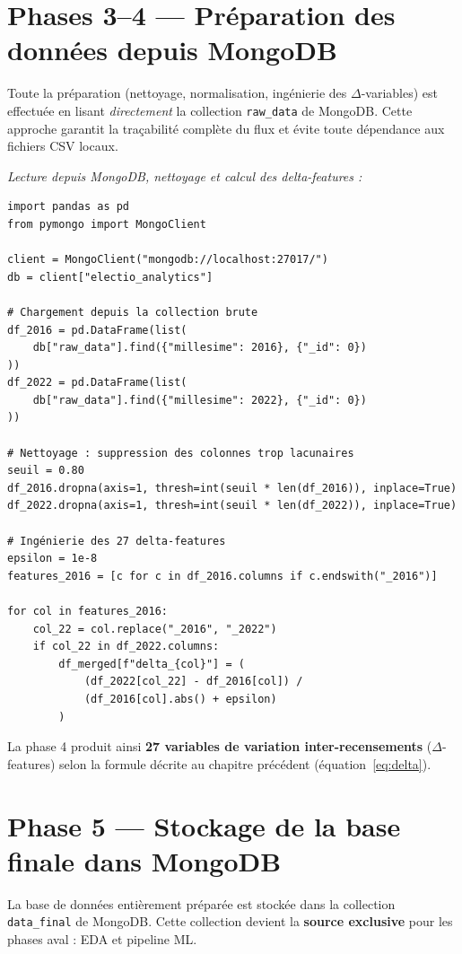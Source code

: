 \section{Phases 3--4 --- Préparation des données depuis MongoDB}

Toute la préparation (nettoyage, normalisation, ingénierie des
\texorpdfstring{$\Delta$}{delta}-variables) est effectuée en lisant
\emph{directement} la collection \texttt{raw\_data} de MongoDB.
Cette approche garantit la traçabilité complète du flux et évite toute
dépendance aux fichiers CSV locaux.

\medskip\noindent\textit{Lecture depuis MongoDB, nettoyage et calcul des delta-features :}
\begin{verbatim}
import pandas as pd
from pymongo import MongoClient

client = MongoClient("mongodb://localhost:27017/")
db = client["electio_analytics"]

# Chargement depuis la collection brute
df_2016 = pd.DataFrame(list(
    db["raw_data"].find({"millesime": 2016}, {"_id": 0})
))
df_2022 = pd.DataFrame(list(
    db["raw_data"].find({"millesime": 2022}, {"_id": 0})
))

# Nettoyage : suppression des colonnes trop lacunaires
seuil = 0.80
df_2016.dropna(axis=1, thresh=int(seuil * len(df_2016)), inplace=True)
df_2022.dropna(axis=1, thresh=int(seuil * len(df_2022)), inplace=True)

# Ingénierie des 27 delta-features
epsilon = 1e-8
features_2016 = [c for c in df_2016.columns if c.endswith("_2016")]

for col in features_2016:
    col_22 = col.replace("_2016", "_2022")
    if col_22 in df_2022.columns:
        df_merged[f"delta_{col}"] = (
            (df_2022[col_22] - df_2016[col]) /
            (df_2016[col].abs() + epsilon)
        )
\end{verbatim}

La phase 4 produit ainsi \textbf{27 variables de variation inter-recensements}
($\Delta$-features) selon la formule décrite au chapitre précédent (équation~\ref{eq:delta}).

\section{Phase 5 --- Stockage de la base finale dans MongoDB}

La base de données entièrement préparée est stockée dans la collection
\texttt{data\_final} de MongoDB. Cette collection devient la
\textbf{source exclusive} pour les phases aval : EDA et pipeline ML.


